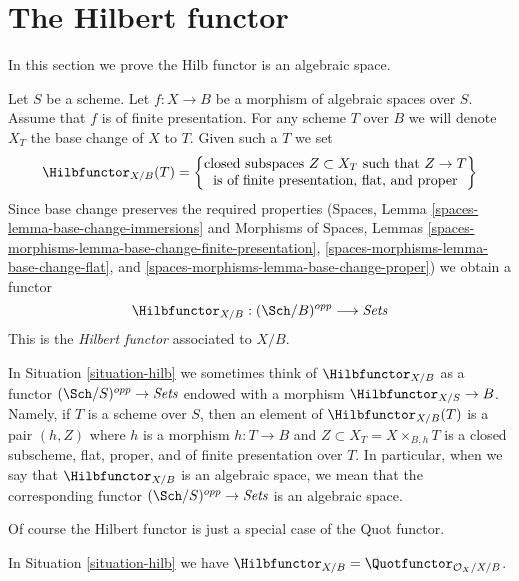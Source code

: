 \section{The Hilbert functor}
\label{section-hilb}

\noindent
In this section we prove the Hilb functor is an algebraic space.

\begin{situation}
\label{situation-hilb}
Let $S$ be a scheme. Let $f : X \to B$ be a morphism of
algebraic spaces over $S$. Assume that $f$ is of finite presentation.
For any scheme $T$ over $B$ we will denote $X_T$ the base change of
$X$ to $T$. Given such a $T$ we set
$$
\Hilbfunctor_{X/B}(T) =
\left\{
\begin{matrix}
\text{closed subspaces }Z \subset X_T\text{ such that }Z \to T\\
\text{is of finite presentation, flat, and proper}
\end{matrix}
\right\}
$$
Since base change preserves the required properties
(Spaces, Lemma \ref{spaces-lemma-base-change-immersions} and
Morphisms of Spaces, Lemmas
\ref{spaces-morphisms-lemma-base-change-finite-presentation},
\ref{spaces-morphisms-lemma-base-change-flat}, and
\ref{spaces-morphisms-lemma-base-change-proper})
we obtain a functor
\begin{equation}
\label{equation-hilb}
\Hilbfunctor_{X/B} : (\Sch/B)^{opp} \longrightarrow \textit{Sets}
\end{equation}
This is the {\it Hilbert functor} associated to $X/B$.
\end{situation}

\noindent
In Situation \ref{situation-hilb} we sometimes think of $\Hilbfunctor_{X/B}$
as a functor $(\Sch/S)^{opp} \to \textit{Sets}$ endowed with a morphism
$\Hilbfunctor_{X/S} \to B$. Namely, if $T$ is a scheme over $S$, then an element
of $\Hilbfunctor_{X/B}(T)$ is a pair $(h, Z)$
where $h$ is a morphism $h : T \to B$
and $Z \subset X_T = X \times_{B, h} T$
is a closed subscheme, flat, proper, and of finite
presentation over $T$. In particular, when we say
that $\Hilbfunctor_{X/B}$ is an algebraic space, we mean that the
corresponding functor $(\Sch/S)^{opp} \to \textit{Sets}$ is an algebraic space.

\medskip\noindent
Of course the Hilbert functor is just a special case of the
Quot functor.

\begin{lemma}
\label{lemma-hilb-is-quot}
In Situation \ref{situation-hilb} we have
$\Hilbfunctor_{X/B} = \Quotfunctor_{\mathcal{O}_X/X/B}$.
\end{lemma}

